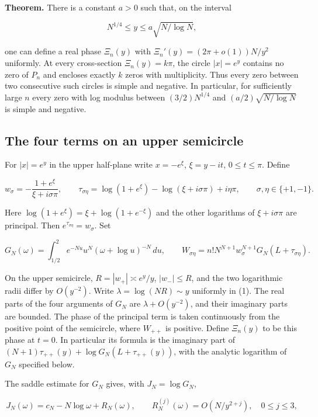 \documentclass[11pt]{article}
\begin{document}
\textbf{Theorem.} There is a constant $a>0$ such that, on the interval

\[
N^{1/4}\le y\le a\sqrt{N/\log N},
\tag{1}
\]

one can define a real phase $\Xi_n(y)$ with $\Xi_n'(y)=(2\pi+o(1))N/y^2$ uniformly. At every cross-section $\Xi_n(y)=k\pi$, the circle $|x|=e^y$ contains no zero of $P_n$ and encloses exactly $k$ zeros with multiplicity. Thus every zero between two consecutive such circles is simple and negative. In particular, for sufficiently large $n$ every zero with log modulus between $(3/2)N^{1/4}$ and $(a/2)\sqrt{N/\log N}$ is simple and negative.

\subsection{The four terms on an upper semicircle}

For $|x|=e^y$ in the upper half-plane write $x=-e^\xi$, $\xi=y-it$, $0\le t\le\pi$. Define

\[
w_\sigma=-\frac{1+e^\xi}{\xi+i\sigma\pi},\qquad
\tau_{\sigma\eta}=\log(1+e^\xi)-\log(\xi+i\sigma\pi)+i\eta\pi,
\qquad \sigma,\eta\in\{+1,-1\}.
\]

Here $\log(1+e^\xi)=\xi+\log(1+e^{-\xi})$ and the other logarithms of $\xi+i\sigma\pi$ are principal. Then $e^{\tau_{\sigma\eta}}=w_\sigma$. Set

\[
G_N(\omega)=\int_{1/2}^{2}e^{-Nu}u^N(\omega+\log u)^{-N}\,du,\qquad
W_{\sigma\eta}=n!N^{N+1}w_\sigma^{N+1}G_N(L+\tau_{\sigma\eta}).
\tag{2}
\]

On the upper semicircle, $R=|w_+|\asymp e^y/y$, $|w_-|\le R$, and the two logarithmic radii differ by $O(y^{-2})$. Write $\lambda=\log(NR)\sim y$ uniformly in (1). The real parts of the four arguments of $G_N$ are $\lambda+O(y^{-2})$, and their imaginary parts are bounded. The phase of the principal term is taken continuously from the positive point of the semicircle, where $W_{++}$ is positive. Define $\Xi_n(y)$ to be this phase at $t=0$. In particular its formula is the imaginary part of $(N+1)\tau_{++}(y)+\log G_N(L+\tau_{++}(y))$, with the analytic logarithm of $G_N$ specified below.

The saddle estimate for $G_N$ gives, with $J_N=\log G_N$,

\[
J_N(\omega)=c_N-N\log\omega+R_N(\omega),\qquad
R_N^{(j)}(\omega)=O(N/y^{2+j}),\quad 0\le j\le3,
\tag{3}
\]
\end{document}
